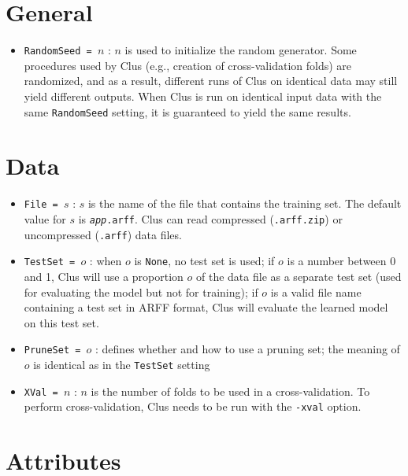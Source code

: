 \documentclass[a4paper]{report}
\begin{document}
\section{General}

\begin{itemize}
\item {\tt RandomSeed = $n$} : $n$ is used to initialize the random generator.
Some procedures used by Clus (e.g., creation of cross-validation folds) are randomized, and as a result, different runs of Clus on identical data may still yield different outputs.  When Clus is run on identical input data with the same {\tt RandomSeed} setting, it is guaranteed to yield the same results.
\end{itemize}

\section{Data}

\begin{itemize}
\item {\tt File = $s$} : $s$ is the name of the file that contains the training set.  The default value for $s$ is {\tt {\em app}.arff}.  Clus can read compressed ({\tt .arff.zip}) or uncompressed ({\tt .arff}) data files.
\item {\tt TestSet = $o$} : when $o$ is {\tt None}, no test set is used; if $o$ is a number between 0 and 1, Clus will use a proportion $o$ of the data file as a separate test set (used for evaluating the model but not for training); if $o$ is a valid file name containing a test set in ARFF format, Clus will evaluate the learned model on this test set.
\item {\tt PruneSet = $o$} : defines whether and how to use a pruning set; the meaning of $o$ is identical as in the {\tt TestSet} setting
\item {\tt XVal = $n$} : $n$ is the number of folds to be used in a cross-validation.  To perform cross-validation, Clus needs to be run with the {\tt -xval} option.
\end{itemize}

\section{Attributes}
\end{document}
